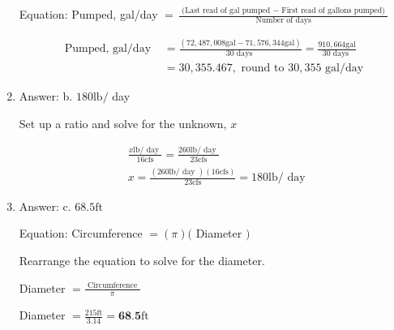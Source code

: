 \documentclass[10pt]{article}
\begin{document}
\begin{enumerate}
Equation: Pumped, gal/day $=\frac{\text { (Last read of gal pumped }-\text { First read of gallons pumped) }}{\text { Number of days }}$

$$
\begin{aligned}
\text { Pumped, gal/day } &=\frac{(72,487,008 \mathrm{gal}-71,576,344 \mathrm{gal})}{30 \text { days }}=\frac{910,664 \mathrm{gal}}{30 \text { days }} \\
&=30,355.467, \text { round to } 30,355 \text { gal/day }
\end{aligned}
$$

  \item Answer: b. $180 \mathrm{lb} /$ day

Set up a ratio and solve for the unknown, $x$

$$
\begin{aligned}
&\frac{x \mathrm{lb} / \text { day }}{16 \mathrm{cfs}}=\frac{260 \mathrm{lb} / \text { day }}{23 \mathrm{cfs}} \\
&x=\frac{(260 \mathrm{lb} / \text { day })(16 \mathrm{cfs})}{23 \mathrm{cfs}}=180 \mathrm{lb} / \text { day }
\end{aligned}
$$

  \item Answer: c. $68.5 \mathrm{ft}$


Equation: Circumference $=(\pi)($ Diameter $)$

Rearrange the equation to solve for the diameter.

Diameter $=\frac{\text { Circumference }}{\pi}$

Diameter $=\frac{215 \mathrm{ft}}{3.14}=\mathbf{6 8 . 5} \mathrm{ft}$


\end{enumerate}
\end{document}
